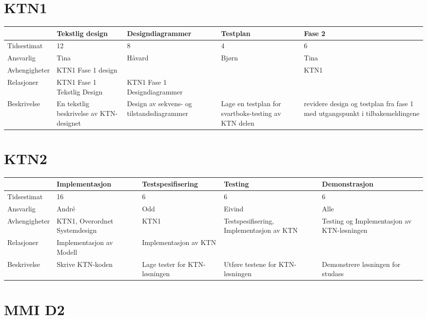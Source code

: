 \documentclass{article}
\begin{document}
\bigskip

\section{KTN1}

\begin{tabular}{|l|p{3cm}|p{3cm}|p{3cm}|p{3cm}|}
\hline
& Tekstlig design & Designdiagrammer & Testplan & Fase 2 \\ \hline
Tidsestimat & 12 & 8 & 4 & 6 \\ \hline
Ansvarlig & Tina & H\aa vard & Bj\o rn & Tina \\ \hline
Avhengigheter & KTN1 Fase 1 design &  &  & KTN1 \\ \hline
Relasjoner & KTN1 Fase 1 Tekstlig Design & KTN1 Fase 1 Designdiagrammer &  & 
\\ \hline
Beskrivelse & En tekstlig beskrivelse av KTN-designet & Design av sekvens-
og tilstandsdiagrammer & Lage en testplan for svartboks-testing av KTN delen
& revidere design og testplan fra fase 1 med utgangspunkt i tilbakemeldingene
\\ \hline
\end{tabular}

\section{KTN2}

\begin{tabular}{|l|p{3cm}|p{3cm}|p{3cm}|p{3cm}|}
\hline
& Implementasjon & Testspesifisering & Testing & Demonstrasjon \\ \hline
Tidsestimat & 16 & 6 & 6 & 6 \\ \hline
Ansvarlig & Andr\'{e} & Odd & Eivind & Alle \\ \hline
Avhengigheter & KTN1, Overordnet Systemdesign & KTN1 & Testspesifisering,
Implementasjon av KTN & Testing og Implementasjon av KTN-l\o sningen \\ 
\hline
Relasjoner & Implementasjon av Modell & Implementasjon av KTN &  &  \\ \hline
Beskrivelse & Skrive KTN-koden & Lage tester for KTN-l\o sningen & Utf\o re
testene for KTN-l\o sningen & Demonstrere l\o sningen for studass \\ \hline
\end{tabular}

\section{MMI D2}
\end{document}
